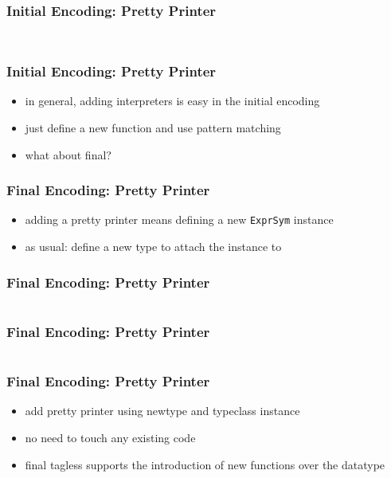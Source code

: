 \documentclass[aspectratio=169, hyperref={colorlinks, linkcolor=beamer@centricgreen}, urlcolor=links]{beamer}
\begin{document}
\begin{frame}
  \frametitle{Initial Encoding: Pretty Printer}
  \inputminted[fontsize=\footnotesize]{scala}{snippets/initial-tagless-pretty-print.scala}
  \vspace{5mm}
  \inputminted[fontsize=\footnotesize]{scala}{snippets/initial-tagless-pretty-print-example.scala}
\end{frame}

\begin{frame}
  \frametitle{Initial Encoding: Pretty Printer}
  \begin{itemize}
  \item in general, adding interpreters is easy in the initial encoding
  \item just define a new function and use pattern matching
  \item what about final?
  \end{itemize}
\end{frame}

\begin{frame}
  \frametitle{Final Encoding: Pretty Printer}
  \begin{itemize}
  \item adding a pretty printer means defining a new \texttt{ExprSym} instance
  \item as usual: define a new type to attach the instance to
  \end{itemize}
\end{frame}

\begin{frame}
  \frametitle{Final Encoding: Pretty Printer}
  \inputminted[fontsize=\footnotesize]{scala}{snippets/final-tagless-pretty-print.scala}
\end{frame}

\begin{frame}
  \frametitle{Final Encoding: Pretty Printer}
  \inputminted[fontsize=\footnotesize]{scala}{snippets/final-tagless-pretty-print-example.scala}
\end{frame}

\begin{frame}
  \frametitle{Final Encoding: Pretty Printer}
  \begin{itemize}
  \item add pretty printer using newtype and typeclass instance
  \item no need to touch any existing code
  \item final tagless supports the introduction of new functions over the datatype
  \end{itemize}
\end{frame}
\end{document}
